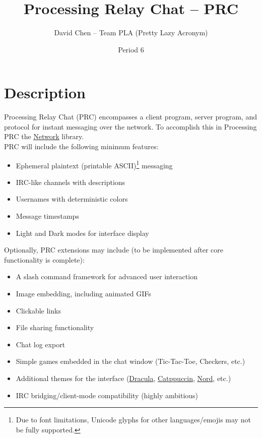 \documentclass{article}
\title{Processing Relay Chat -- PRC}
\author{David Chen -- Team PLA (Pretty Lazy Acronym)}
\date{Period 6}
\begin{document}
\maketitle

\section{Description}
Processing Relay Chat (PRC) encompasses a client program, server program, and protocol for instant messaging over the network. To accomplish this in Processing PRC the \href{https://processing.org/reference/libraries/net/index.html}{Network} library.\\
PRC will include the following minimum features:
\begin{itemize}
    \item Ephemeral plaintext (printable ASCII)\footnote{Due to font limitations, Unicode glyphs for other languages/emojis may not be fully supported.} messaging
    \item IRC-like channels with descriptions
    \item Usernames with deterministic colors
    \item Message timestamps
    \item Light and Dark modes for interface display
\end{itemize}

Optionally, PRC extensions may include (to be implemented after core functionality is complete):
\begin{itemize}
    \item A slash command framework for advanced user interaction
    \item Image embedding, including animated GIFs
    \item Clickable links
    \item File sharing functionality
    \item Chat log export
    \item Simple games embedded in the chat window (Tic-Tac-Toe, Checkers, etc.)
    \item Additional themes for the interface (\href{https://draculatheme.com/}{Dracula}, \href{https://catppuccin.com/}{Catppuccin}, \href{https://www.nordtheme.com/}{Nord}, etc.)
    \item IRC bridging/client-mode compatibility (highly ambitious)
\end{itemize}

\end{document}
